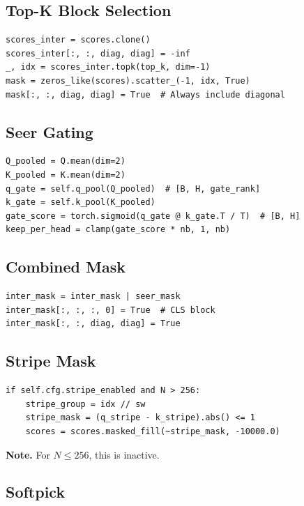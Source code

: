 \subsection{Top-K Block Selection}

\begin{lstlisting}
scores_inter = scores.clone()
scores_inter[:, :, diag, diag] = -inf
_, idx = scores_inter.topk(top_k, dim=-1)
mask = zeros_like(scores).scatter_(-1, idx, True)
mask[:, :, diag, diag] = True  # Always include diagonal
\end{lstlisting}

\subsection{Seer Gating}

\begin{lstlisting}
Q_pooled = Q.mean(dim=2)
K_pooled = K.mean(dim=2)
q_gate = self.q_pool(Q_pooled)  # [B, H, gate_rank]
k_gate = self.k_pool(K_pooled)
gate_score = torch.sigmoid(q_gate @ k_gate.T / T)  # [B, H]
keep_per_head = clamp(gate_score * nb, 1, nb)
\end{lstlisting}

\subsection{Combined Mask}

\begin{lstlisting}
inter_mask = inter_mask | seer_mask
inter_mask[:, :, :, 0] = True  # CLS block
inter_mask[:, :, diag, diag] = True
\end{lstlisting}

\subsection{Stripe Mask}

\begin{lstlisting}
if self.cfg.stripe_enabled and N > 256:
    stripe_group = idx // sw
    stripe_mask = (q_stripe - k_stripe).abs() <= 1
    scores = scores.masked_fill(~stripe_mask, -10000.0)
\end{lstlisting}

\textbf{Note.} For $N \leq 256$, this is inactive.

\subsection{Softpick}


